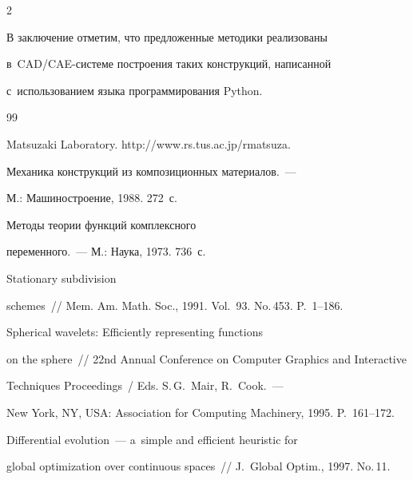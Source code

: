 \begin{multicols}{2}
  


  В заключение отметим, что предложенные методики реализованы  


в~CAD/CAE-сис\-те\-ме по\-стро\-ения таких конструкций, написанной 


с~использованием языка программирования Python.


  


{\small\frenchspacing


 {%




 \begin{thebibliography}{99}




Matsuzaki Laboratory. {\sf http://www.rs.tus.ac.jp/\linebreak rmatsuza}.




 Механика конструкций из композиционных материалов.~--- 


М.: Машиностроение, 1988. 272~с.




 Методы тео\-рии функций комплексного 


переменного.~--- М.: Наука, 1973. 736~с.




 Stationary subdivision 


schemes~// Mem. Am. Math. Soc., 1991. Vol.~93. No.\,453. P.~1--186.




 Spherical wavelets: Efficiently representing functions 


on the sphere~// 22nd Annual Conference on Computer Graphics and Interactive 


Techniques Proceedings~/ Eds. S.\,G.~Mair, R.~Cook.~---


New York, NY, USA: Association for Computing Machinery, 1995. P.~161--172.




 Differential evolution~--- a~simple and efficient heuristic for 


global optimization over continuous spaces~// J.~Global Optim., 1997. No.\,11. 



\end{thebibliography}}}
\end{multicols}
